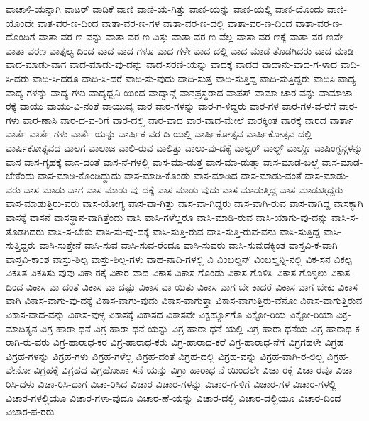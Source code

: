 {ವಾಚಾಳಿ-ಯನ್ನಾಗಿ
ವಾಟರ್
ವಾಡಿಕೆ
ವಾಣಿ
ವಾಣಿ-ಯ-ಗಿತ್ತು
ವಾಣಿ-ಯನ್ನು
ವಾಣಿ-ಯಲ್ಲಿ
ವಾಣಿ-ಯೊಂದು
ವಾಣಿ-ಯೊಂದೇ
ವಾತ-ವರ-ಣ-ದಿಂದ
ವಾತಾ-ವರ-ಣ-ಗಳ
ವಾತಾ-ವರ-ಣ-ದಲ್ಲಿ
ವಾತಾ-ವರ-ಣ-ದಿಂದ
ವಾತಾ-ವರ-ಣ-ದೊಂದಿಗೆ
ವಾತಾ-ವರ-ಣ-ವನ್ನು
ವಾತಾ-ವರ-ಣ-ವಿತ್ತು
ವಾತಾ-ವರ-ಣ-ವೆಲ್ಲ
ವಾತಾ-ವರ-ಣಕ್ಕೆ
ವಾತಾ-ವರ-ಣವೇ
ವಾತಾ-ವರಣ
ವಾತ್ಸಲ್ಯ-ದಿಂದ
ವಾದ
ವಾದ-ಗಳೂ
ವಾದ-ಗಳೇ
ವಾದ-ದಲ್ಲಿ
ವಾದ-ಮಾಡ-ತೊಡಗಿದರು
ವಾದ-ಮಾಡಿ
ವಾದ-ಮಾಡು-ವಾಗ
ವಾದ-ಮಾಡು-ವು-ದನ್ನು
ವಾದ-ಸರಣಿ-ಯನ್ನು
ವಾದಕ್ಕೆ
ವಾದದ
ವಾದಾನು-ವಾದ-ಗ-ಳಾದ
ವಾದಿ-ಸಿ-ದರು
ವಾದಿ-ಸಿ-ದರೂ
ವಾದಿ-ಸಿ-ದರೆ
ವಾದಿ-ಸು-ವುದು
ವಾದಿ-ಸುತ್ತ
ವಾದಿ-ಸುತ್ತಿದ್ದ
ವಾದಿ-ಸುತ್ತಿದ್ದರು
ವಾದಿಸಿ
ವಾದ್ಯ
ವಾದ್ಯ-ಗಳನ್ನು
ವಾದ್ಯ-ಗಳು
ವಾದ್ಯಧ್ವನಿ-ಯಿಂದ
ವಾದ್ವಾನ್ಗೆ
ವಾನಪ್ರಸ್ಥರಾದ
ವಾಪಸ್
ವಾಮಾ-ಚಾರ-ವನ್ನು
ವಾಮಾಚಾ-ರಕ್ಕೆ
ವಾಯು
ವಾಯು-ವಿ-ನಂತೆ
ವಾಯುವ್ಯ
ವಾರ
ವಾರ-ಗಳನ್ನು
ವಾರ-ಗ-ಳಿದ್ದರು
ವಾರ-ಗಳ
ವಾರ-ಗಳ-ವ-ರೆಗೆ
ವಾರ-ಗಳು
ವಾರ-ಣಾಸಿ
ವಾರ-ದ-ವ-ರಿಗೆ
ವಾರ-ದಲ್ಲಿ
ವಾರ-ವಾದ
ವಾರ-ವಾದ-ಮೇಲೆ
ವಾರಕ್ಕಿಂತ
ವಾರಕ್ಕೆ
ವಾರದ
ವಾರ್ತಾ
ವಾರ್ತೆ
ವಾರ್ತೆ-ಗಳು
ವಾರ್ತೆ-ಯನ್ನು
ವಾರ್ಷಿಕ-ವರ-ದಿ-ಯಲ್ಲಿ
ವಾರ್ಷಿಕೋತ್ಸವ
ವಾರ್ಷಿಕೋತ್ಸವ-ದಲ್ಲಿ
ವಾರ್ಷಿಕೋತ್ಸವದ
ವಾಲಗ
ವಾಲಾಜ
ವಾಲಿ-ರುವ
ವಾಲಿತ್ತು
ವಾಲು-ವು-ದಕ್ಕೆ
ವಾಲ್ಟರ್
ವಾಲ್ಟ್
ವಾಲ್ಡೊ
ವಾಷಿಂಗ್ಟನ್ಗಳನ್ನು
ವಾಸ
ವಾಸ-ಗೃಹಕ್ಕೆ
ವಾಸ-ದಂತೆ
ವಾಸ-ನೆ-ಗಳಲ್ಲಿ
ವಾಸ-ಮಾ-ಡುತ್ತ
ವಾಸ-ಮಾ-ಡುತ್ತಾ
ವಾಸ-ಮಾಡ-ಬಲ್ಲೆ
ವಾಸ-ಮಾಡ-ಬೇಕೆಂದು
ವಾಸ-ಮಾಡಿ-ಕೊಂಡಿದ್ದುದು
ವಾಸ-ಮಾಡಿ-ಕೊಂಡು
ವಾಸ-ಮಾಡಿದ
ವಾಸ-ಮಾಡು-ವಂತೆ
ವಾಸ-ಮಾಡು-ವರು
ವಾಸ-ಮಾಡು-ವಾಗ
ವಾಸ-ಮಾಡು-ವು-ದಕ್ಕೆ
ವಾಸ-ಮಾಡು-ವುದು
ವಾಸ-ಮಾಡುತ್ತಿದ್ದ
ವಾಸ-ಮಾಡುತ್ತಿದ್ದರು
ವಾಸ-ಮಾಡುತ್ತಿರು-ವರು
ವಾಸ-ಯೋಗ್ಯ
ವಾಸ-ವಾ-ಗಿತ್ತು
ವಾಸ-ವಾ-ಗಿದ್ದರು
ವಾಸ-ವಾಗಿ-ರುವ
ವಾಸ-ವಾಗಿದ್ದ
ವಾಸಕ್ಕಾಗಿ
ವಾಸಕ್ಕೆ
ವಾಸನೆ
ವಾಸಸ್ಥಾನ-ವಾಗಿತ್ತೆಂದು
ವಾಸಿ
ವಾಸಿ-ಗಳೆಲ್ಲರೂ
ವಾಸಿ-ಮಾಡಿ-ರುವ
ವಾಸಿ-ಯಾಗು-ವು-ದನ್ನು
ವಾಸಿ-ಸ-ತೊಡಗಿದರು
ವಾಸಿ-ಸ-ಬೇಕು
ವಾಸಿ-ಸು-ವು-ದಕ್ಕೆ
ವಾಸಿ-ಸುತ್ತಿ-ರುವ
ವಾಸಿ-ಸುತ್ತಿ-ರುವ-ವನು
ವಾಸಿ-ಸುತ್ತಿದ್ದ
ವಾಸಿ-ಸುತ್ತಿದ್ದರು
ವಾಸಿ-ಸುತ್ತೇನೆ
ವಾಸಿ-ಸುವ
ವಾಸಿ-ಸುವ-ರೆಂದೂ
ವಾಸಿ-ಸುವರು
ವಾಸಿ-ಸುವುದಕ್ಕಿಂತ
ವಾಸ್ತವಿ-ಕ-ವಾಗಿ
ವಾಸ್ತವಿ-ಕಾಂಶ
ವಾಸ್ತು-ಶಿಲ್ಪ
ವಾಸ್ತು-ಶಿಲ್ಪ-ಗಳು
ವಾಹ-ನಾದಿ-ಗಳಲ್ಲಿ
ವಿ
ವಿಂಬಲ್ಡನ್
ವಿಂಬಲ್ಡನ್ನಿ-ನಲ್ಲಿ
ವಿಕ-ಸನ
ವಿಕಲ್ಪ
ವಿಕಸಿತ
ವಿಕಸಿಸು-ವುವು
ವಿಕಾ-ರಕ್ಕೆ
ವಿಕಾರ-ವಾದ
ವಿಕಾಸ
ವಿಕಾಸ-ಗೊಂಡು
ವಿಕಾಸ-ಗೊಳಿಸಿ
ವಿಕಾಸ-ಗೊಳ್ಳಲು
ವಿಕಾಸ-ದಿಂದ
ವಿಕಾಸ-ವಾ-ದಂತೆ
ವಿಕಾಸ-ವಾ-ದಷ್ಟು
ವಿಕಾಸ-ವಾ-ಯಿತು
ವಿಕಾಸ-ವಾಗ-ಬೇ-ಕಾದರೆ
ವಿಕಾಸ-ವಾಗ-ಬೇಕು
ವಿಕಾಸ-ವಾಗಿ
ವಿಕಾಸ-ವಾಗು-ವು-ದಕ್ಕೆ
ವಿಕಾಸ-ವಾಗು-ವುದು
ವಿಕಾಸ-ವಾಗುತ್ತಾ
ವಿಕಾಸ-ವಾಗುತ್ತಿರು-ವೆನೋ
ವಿಕಾಸ-ವಾಗುತ್ತಿರುವ
ವಿಕಾಸ-ವಾದ-ವನ್ನು
ವಿಕಾಸ-ವುಳ್ಳ
ವಿಕಾಸಕ್ಕೆ
ವಿಕಾಸದ
ವಿಕಾಸವೇ
ವಿಕ್ಟರ್ಹ್ಯೂಗೊ
ವಿಕ್ಟೋ-ರಿಯ
ವಿಕ್ಟೋ-ರಿಯಾ
ವಿಕ್ರ-ಮಾದಿತ್ಯನ
ವಿಗ್ರ-ಹಾರಾ-ಧನೆ
ವಿಗ್ರ-ಹಾರಾ-ಧನೆ-ಯನ್ನು
ವಿಗ್ರ-ಹಾರಾ-ಧನೆ-ಯಲ್ಲಿ
ವಿಗ್ರ-ಹಾರಾ-ಧನೆಯ
ವಿಗ್ರ-ಹಾರಾಧ-ಕ-ರಾಗಿ-ರು-ವರು
ವಿಗ್ರ-ಹಾರಾಧ-ಕರ
ವಿಗ್ರ-ಹಾರಾಧ-ಕರು
ವಿಗ್ರ-ಹಾರಾಧ-ಕರೆ
ವಿಗ್ರ-ಹಾರಾಧ-ನೆಗೆ
ವಿಗ್ರಗಹಳೇ
ವಿಗ್ರಹ
ವಿಗ್ರಹ-ಗಳನ್ನು
ವಿಗ್ರಹ-ಗಳು
ವಿಗ್ರಹ-ಗಳೆಲ್ಲ
ವಿಗ್ರಹ-ದಂತೆ
ವಿಗ್ರಹ-ದಲ್ಲಿ
ವಿಗ್ರಹ-ವನ್ನು
ವಿಗ್ರಹ-ವಾಗಿ-ರ-ಲಿಲ್ಲ
ವಿಗ್ರಹ-ವೇನೋ
ವಿಗ್ರಹಕ್ಕೆ
ವಿಗ್ರಹದ
ವಿಗ್ರಹೋಪಾ-ಸನೆ-ಯನ್ನು
ವಿಗ್ರಾ-ಹಾರಾಧ-ನೆ-ಯಿಂದಲೇ
ವಿಚಾ-ರಕ್ಕೆ
ವಿಚಾ-ರವೂ
ವಿಚಾ-ರಿಸಿ-ದಳು
ವಿಚಾ-ರಿಸಿ-ದಾಗ
ವಿಚಾ-ರಿಸಿದ
ವಿಚಾರ
ವಿಚಾರ-ಗಳನ್ನು
ವಿಚಾರ-ಗ-ಳಿಗೆ
ವಿಚಾರ-ಗಳ
ವಿಚಾರ-ಗಳಲ್ಲಿ
ವಿಚಾರ-ಗಳಲ್ಲಿಯೂ
ವಿಚಾರ-ಗಳಾ-ವುದೂ
ವಿಚಾರ-ಣೆ-ಯನ್ನು
ವಿಚಾರ-ದಲ್ಲಿ
ವಿಚಾರ-ದಲ್ಲಿಯೂ
ವಿಚಾರ-ದಿಂದ
ವಿಚಾರ-ಪ-ರರು
}
